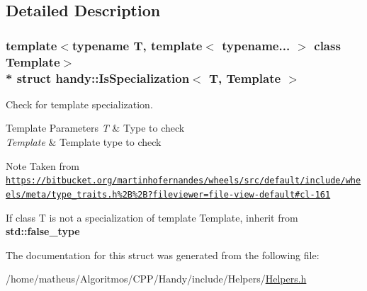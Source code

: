 \subsection{Detailed Description}
\subsubsection*{template$<$typename T, template$<$ typename... $>$ class Template$>$\\*
struct handy\+::\+Is\+Specialization$<$ T, Template $>$}

Check for template specialization. 


\begin{DoxyTemplParams}{Template Parameters}
{\em T} & Type to check \\
\hline
{\em Template} & Template type to check \\
\hline
\end{DoxyTemplParams}
\begin{DoxyNote}{Note}
Taken from \href{https://bitbucket.org/martinhofernandes/wheels/src/default/include/wheels/meta/type_traits.h%2B%2B?fileviewer=file-view-default#cl-161}{\tt https\+://bitbucket.\+org/martinhofernandes/wheels/src/default/include/wheels/meta/type\+\_\+traits.\+h\%2\+B\%2\+B?fileviewer=file-\/view-\/default\#cl-\/161}
\end{DoxyNote}
If class {\ttfamily T} is not a specialization of template {\ttfamily Template}, inherit from {\bf std\+::false\+\_\+type} 

The documentation for this struct was generated from the following file\+:\begin{DoxyCompactItemize}
\item 
/home/matheus/\+Algoritmos/\+C\+P\+P/\+Handy/include/\+Helpers/\hyperlink{Helpers_2Helpers_8h}{Helpers.\+h}\end{DoxyCompactItemize}
